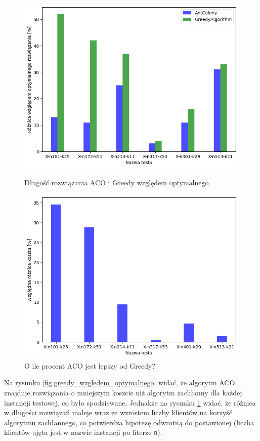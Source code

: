 \documentclass{article}
\begin{document}
\begin{figure}[H]
    \centering
    \begin{minipage}{0.48\textwidth}
        \centering
        \includegraphics[width=\linewidth]{img/greed_wzgledem_optymalnego.png}
        \caption{Długość rozwiązania ACO i Greedy względem optymalnego}
        \label{fig:greedy_wzgledem_optymalnego}
    \end{minipage}
    \hfill
    \begin{minipage}{0.48\textwidth}
        \centering
        \includegraphics[width=\linewidth]{img/greedy_wzgledem_zwyklego.png}
        \caption{O ile procent ACO jest lepszy od Greedy?}
        \label{fig:greedy_wzgledem_zwyklego}
    \end{minipage}
\end{figure}
\noindent Na rysunku \ref{fig:greedy_wzgledem_optymalnego} widać, że algorytm ACO znajduje rozwiązania o mniejszym koszcie niż algorytm zachłanny dla każdej instancji testowej, co było spodziewane.
Jednakże na rysunku \ref{fig:greedy_wzgledem_zwyklego} widać, że różnica w długości rozwiązań maleje wraz ze wzrostem liczby klientów na korzyść algorytmu zachłannego, co potwierdza hipotezę odwrotną do postawionej (liczba klientów ujęta jest w nazwie instancji po literze \texttt{n}).
\end{document}
